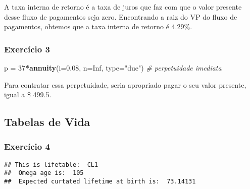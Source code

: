 \documentclass[]{article}
\newenvironment{Shaded}{\begin{snugshade}}{\end{snugshade}}
\newcommand{\CommentTok}[1]{\textcolor[rgb]{0.56,0.35,0.01}{\textit{#1}}}
\newcommand{\DataTypeTok}[1]{\textcolor[rgb]{0.13,0.29,0.53}{#1}}
\newcommand{\DecValTok}[1]{\textcolor[rgb]{0.00,0.00,0.81}{#1}}
\newcommand{\FloatTok}[1]{\textcolor[rgb]{0.00,0.00,0.81}{#1}}
\newcommand{\KeywordTok}[1]{\textcolor[rgb]{0.13,0.29,0.53}{\textbf{#1}}}
\newcommand{\NormalTok}[1]{#1}
\newcommand{\OperatorTok}[1]{\textcolor[rgb]{0.81,0.36,0.00}{\textbf{#1}}}
\newcommand{\OtherTok}[1]{\textcolor[rgb]{0.56,0.35,0.01}{#1}}
\newcommand{\StringTok}[1]{\textcolor[rgb]{0.31,0.60,0.02}{#1}}
\begin{document}
A taxa interna de retorno é a taxa de juros que faz com que o valor
presente desse fluxo de pagamentos seja zero. Encontrando a raiz do VP
do fluxo de pagamentos, obtemos que a taxa interna de retorno é 4.29\%.

\hypertarget{exercicio-3}{%
\subsubsection{Exercício 3}\label{exercicio-3}}

\begin{Shaded}
\begin{Highlighting}[]
\NormalTok{p =}\StringTok{ }\DecValTok{37}\OperatorTok{*}\KeywordTok{annuity}\NormalTok{(}\DataTypeTok{i=}\FloatTok{0.08}\NormalTok{, }\DataTypeTok{n=}\OtherTok{Inf}\NormalTok{, }\DataTypeTok{type=}\StringTok{"due"}\NormalTok{) }\CommentTok{# perpetuidade imediata}
\end{Highlighting}
\end{Shaded}

Para contratar essa perpetuidade, seria apropriado pagar o seu valor
presente, igual a \$ 499.5.

\hypertarget{tabelas-de-vida}{%
\subsection{Tabelas de Vida}\label{tabelas-de-vida}}

\hypertarget{exercicio-4}{%
\subsubsection{Exercício 4}\label{exercicio-4}}

\begin{Shaded}
\end{Shaded}

\begin{verbatim}
## This is lifetable:  CL1 
##  Omega age is:  105 
##  Expected curtated lifetime at birth is:  73.14131
\end{verbatim}
\end{document}
